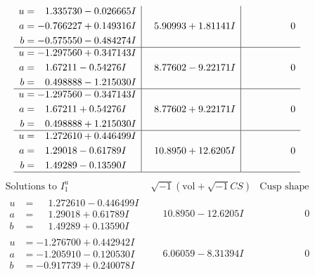 \documentclass[1p]{elsarticle_modified}
\theoremstyle{definition}
\newcommand{\I}{\sqrt{-1}}
\begin{document}
$$\begin{array}{c|c|c}
\begin{aligned}
u &= \phantom{-}1.335730 - 0.026665 I \\
a &= -0.766227 + 0.149316 I \\
b &= -0.575550 - 0.484274 I\end{aligned}
 & \phantom{-}5.90993 + 1.81141 I & \phantom{-0.000000 } 0 \\ \hline\begin{aligned}
u &= -1.297560 + 0.347143 I \\
a &= \phantom{-}1.67211 - 0.54276 I \\
b &= \phantom{-}0.498888 - 1.215030 I\end{aligned}
 & \phantom{-}8.77602 - 9.22171 I & \phantom{-0.000000 } 0 \\ \hline\begin{aligned}
u &= -1.297560 - 0.347143 I \\
a &= \phantom{-}1.67211 + 0.54276 I \\
b &= \phantom{-}0.498888 + 1.215030 I\end{aligned}
 & \phantom{-}8.77602 + 9.22171 I & \phantom{-0.000000 } 0 \\ \hline\begin{aligned}
u &= \phantom{-}1.272610 + 0.446499 I \\
a &= \phantom{-}1.29018 - 0.61789 I \\
b &= \phantom{-}1.49289 - 0.13590 I\end{aligned}
 & \phantom{-}10.8950 + 12.6205 I & \phantom{-0.000000 } 0\\
 \hline 
 \end{array}$$\newpage$$\begin{array}{c|c|c}  
\text{Solutions to }I^u_{1}& \I (\text{vol} + \sqrt{-1}CS) & \text{Cusp shape}\\
 \hline 
\begin{aligned}
u &= \phantom{-}1.272610 - 0.446499 I \\
a &= \phantom{-}1.29018 + 0.61789 I \\
b &= \phantom{-}1.49289 + 0.13590 I\end{aligned}
 & \phantom{-}10.8950 - 12.6205 I & \phantom{-0.000000 } 0 \\ \hline\begin{aligned}
u &= -1.276700 + 0.442942 I \\
a &= -1.205910 - 0.120530 I \\
b &= -0.917739 + 0.240078 I\end{aligned}
 & \phantom{-}6.06059 - 8.31394 I & \phantom{-0.000000 } 0 \\ \hline\begin{aligned}

\end{aligned}
\end{array}$$
\end{document}

